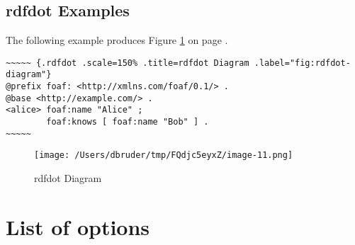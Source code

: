 \documentclass[]{article}
\begin{document}
\subsection{rdfdot Examples}\label{rdfdot-examples}

The following example produces Figure \ref{"fig:rdfdot-diagram"} on page
\pageref{"fig:rdfdot-diagram"}.

\scriptsize

\begin{verbatim}
~~~~~ {.rdfdot .scale=150% .title=rdfdot Diagram .label="fig:rdfdot-diagram"}
@prefix foaf: <http://xmlns.com/foaf/0.1/> .
@base <http://example.com/> .
<alice> foaf:name "Alice" ;
        foaf:knows [ foaf:name "Bob" ] .
~~~~~
\end{verbatim}

\normalsize

\begin{figure}[htbp]
\centering
\texttt{[image: /Users/dbruder/tmp/FQdjc5eyxZ/image-11.png]}
\caption{rdfdot Diagram\label{"fig:rdfdot-diagram"}}
\end{figure}

\newpage

\section{List of options}\label{list-of-options}
\end{document}
